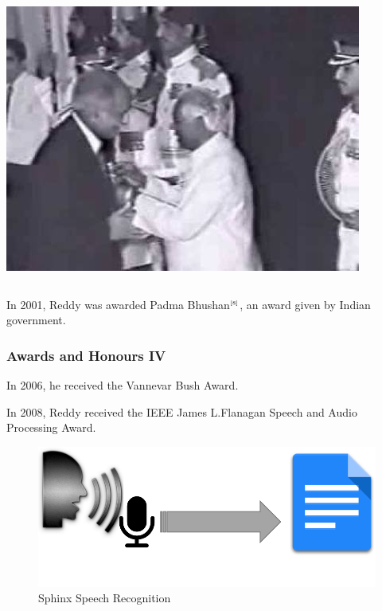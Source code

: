 \documentclass{beamer}
\begin{document}
\begin{frame}[allowframebreaks]
\begin{columns}
      \begin{column}{0.5\textwidth}
       \begin{center}
        \includegraphics[scale=0.3]{pb.jpg}
       \end{center}

      \end{column}

    \end{columns}
    
      In 2001, Reddy was awarded Padma Bhushan$^{\tiny\cite{8}}$, an award given by Indian
      government.
                      
\end{frame}
 
\begin{frame}
 \frametitle{Awards and Honours IV}
 
  \begin{block}{}
      	      In 2006, he received the Vannevar Bush Award. 
	      \end{block}
 
  \begin{block}{}
	      In 2008, Reddy received the IEEE James L.Flanagan Speech and Audio 
	      Processing Award. 
	     \end{block}   
     \begin{figure}
      \includegraphics[scale=0.5]{rajsrs.png}
      \caption{Sphinx Speech Recognition}
     \end{figure}

\end{frame}
\end{document}
